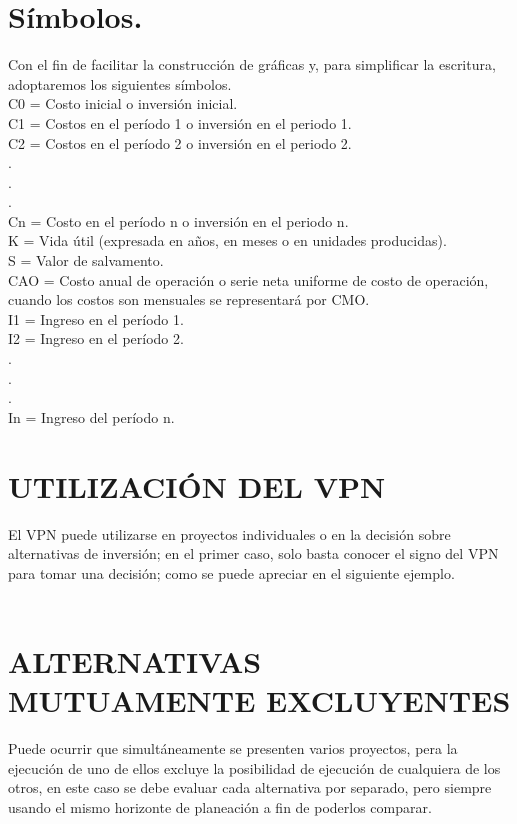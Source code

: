 \section{Símbolos.}

Con el fin de facilitar la construcción de gráficas y, para simplificar la escritura, adoptaremos los siguientes símbolos.\\

C0  =  Costo inicial o inversión inicial.\\
C1  =  Costos en el período 1 o inversión en el periodo 1.\\
C2  =  Costos en el período 2 o inversión en el periodo 2.\\
.\\
.\\
.\\
Cn  =  Costo en el período n o inversión en el periodo n.\\
K  =  Vida útil (expresada en años, en meses o en unidades producidas).\\
S  =  Valor de salvamento.\\
CAO  =  Costo anual de operación o serie neta uniforme de costo de operación, cuando los costos son mensuales se representará por CMO.\\
I1  =  Ingreso en el período 1.\\
I2  =  Ingreso en el período 2.\\
.\\
.\\
.\\
In  =  Ingreso del período n.\\

\section{UTILIZACIÓN DEL VPN}

El VPN puede utilizarse en proyectos individuales o en la decisión sobre alternativas de inversión; en el primer caso, solo basta conocer el signo del VPN para tomar una decisión; como se puede apreciar en el siguiente ejemplo.\\
\\


\section{ALTERNATIVAS MUTUAMENTE EXCLUYENTES}

Puede ocurrir que simultáneamente se presenten varios proyectos, pera la ejecución de uno de ellos excluye la posibilidad de ejecución de cualquiera de los otros, en este caso se debe evaluar cada alternativa por separado, pero siempre usando el mismo horizonte de planeación a fin de poderlos comparar.\\
\\


